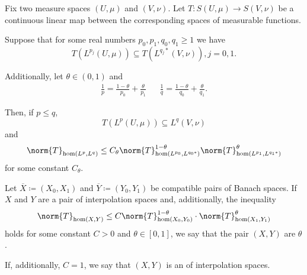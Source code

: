 \begin{theorem}
  Fix two measure spaces \( (U, \mu) \) and \( (V, \nu) \). Let \( T: S(U, \mu) \to S(V, \nu) \) be a continuous linear map between the corresponding spaces of measurable functions.

  Suppose that for some real numbers \( p_0, p_1, q_0, q_1 \geq 1 \) we have
  \begin{equation*}
    T(L^{p_j}(U, \mu)) \subseteq T(L^{q_j *}(V, \nu)), j = 0, 1.
  \end{equation*}

  Additionally, let \( \theta \in (0, 1) \) and
  \begin{align*}
    \frac 1 p = \frac {1 - \theta} {p_0} + \frac {\theta} {p_1}
    &&
    \frac 1 q = \frac {1 - \theta} {q_0} + \frac {\theta} {q_1}.
  \end{align*}

  Then, if \( p \leq q \),
  \begin{equation*}
    T(L^p(U, \mu)) \subseteq L^q(V, \nu)
  \end{equation*}
  and
  \begin{equation*}
    \norm{T}_{\hom(L^p, L^q)} \leq C_\theta \norm{T}_{\hom(L^{p_0}, L^{q_0*})}^{1 - \theta} \norm{T}_{\hom(L^{p_1}, L^{q_1*})}^\theta
  \end{equation*}
  for some constant \( C_\theta \).
\end{theorem}

\begin{definition}\label{def:banach_interpolation_space_exponent}
  Let \( \overline{X} \coloneqq ( X_0, X_1 ) \) and \( \overline{Y} \coloneqq ( Y_0, Y_1 ) \) be compatible pairs of Banach spaces. If \( X \) and \( Y \) are a pair of interpolation spaces and, additionally, the inequality
  \begin{equation}\label{da:def:banach_interpolation_space_exponent}
    \norm{T}_{\hom(X, Y)} \leq C \norm{T}_{\hom(X_0, Y_0)}^{1-\theta} \cdot \norm{T}_{\hom(X_1, Y_1)}^{\theta}
  \end{equation}
  holds for some constant \( C > 0 \) and \( \theta \in [0, 1] \), we say that the pair \( (X, Y) \) are  \( \theta \).

  If, additionally, \( C = 1 \), we say that \( (X, Y) \) is an  of interpolation spaces.
\end{definition}

